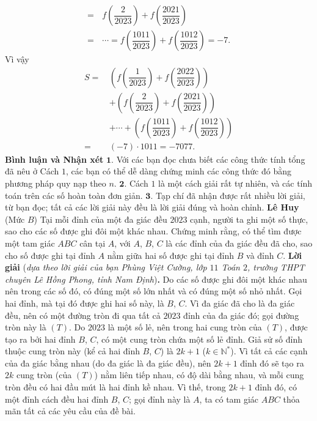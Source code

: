 \begin{multicols}{2}
\begin{align*}
		= \,&f\left( {\dfrac{2}{{2023}}} \right) + f\left( {\dfrac{{2021}}{{2023}}} \right) \\[-0.3ex]
		= \,& \cdots  = f\left( {\dfrac{{1011}}{{2023}}} \right) + f\left( {\dfrac{{1012}}{{2023}}} \right) =  - 7.
	\end{align*}
	Vì vậy
	\begin{align*}
			S =\,& \left( {f\left( {\dfrac{1}{{2023}}} \right) + f\left( {\dfrac{{2022}}{{2023}}} \right)} \right) \\[-0.3ex]
			&+ \left( {f\left( {\dfrac{2}{{2023}}} \right) + f\left( {\dfrac{{2021}}{{2023}}} \right)} \right) \\[-0.3ex]
			&+  \cdots  + \left( {f\left( {\dfrac{{1011}}{{2023}}} \right) + f\left( {\dfrac{{1012}}{{2023}}} \right)} \right)\\[-0.3ex]
			 = \,&\left( { - 7} \right) \cdot 1011 =  - 7077.
	\end{align*}
	\textbf{\color{thachthuctoanhoc}Bình luận và Nhận xét}
	\vskip 0.05cm
	$\pmb{1.}$ Với các bạn đọc chưa biết các công thức tính tổng đã nêu ở Cách $1$, các bạn có thể dễ dàng chứng minh các công thức đó bằng phương pháp quy nạp theo $n$.
	\vskip 0.05cm
	$\pmb{2.}$ Cách $1$ là một cách giải rất tự nhiên, và các tính toán trên các số hoàn toàn đơn giản.
	\vskip 0.05cm
	$\pmb{3.}$ Tạp chí đã nhận được rất nhiều lời giải, từ bạn đọc; tất cả các lời giải này đều là lời giải đúng và hoàn chỉnh.
	\vskip 0.1cm
		\hfill\textbf{\color{thachthuctoanhoc}Lê Huy}
	\vskip 0.1cm
	{}
	(Mức $B$) Tại mỗi đỉnh của một đa giác đều $2023$ cạnh, người ta ghi một số thực, sao cho các số được ghi đôi một khác nhau. Chứng minh rằng, có thể tìm được một tam giác $ABC$ cân tại $A$, với $A$, $B$, $C$ là các đỉnh của đa giác đều đã cho, sao cho số được ghi tại đỉnh $A$ nằm giữa hai số được ghi tại đỉnh $B$ và đỉnh $C$.
	\vskip 0.05cm
	\textbf{\color{thachthuctoanhoc}Lời giải} (\textit{dựa theo lời giải của bạn Phùng Việt Cường, lớp $11$ Toán $2$, trường THPT chuyên Lê Hồng Phong, tỉnh Nam Định})\textbf{\color{thachthuctoanhoc}.}
	\vskip 0.05cm
	Do các số được ghi đôi một khác nhau nên trong các số đó, có đúng một số lớn nhất và có đúng một số nhỏ nhất. Gọi hai đỉnh, mà tại đó được ghi hai số này, là $B$, $C$.
	\vskip 0.05cm
	Vì đa giác đã cho là đa giác đều, nên có một đường tròn đi qua tất cả $2023$ đỉnh của đa giác đó; gọi đường tròn này là $(T)$.
	\vskip 0.05cm
	Do $2023$ là một số lẻ, nên trong hai cung tròn của $(T)$, được tạo ra bởi hai đỉnh $B$, $C$, có một cung tròn chứa một số lẻ đỉnh. Giả sử số đỉnh thuộc cung tròn này (kể cả hai đỉnh $B$, $C$) là $2k + 1$ ($k \in \mathbb{N^*}$). Vì tất cả các cạnh của đa giác bằng nhau (do đa giác là đa giác đều), nên $2k + 1$ đỉnh đó sẽ tạo ra $2k$ cung tròn (của $(T)$) nằm liên tiếp nhau, có độ dài bằng nhau, và mỗi cung tròn đều có hai đầu mút là hai đỉnh kề nhau. Vì thế, trong $2k + 1$ đỉnh đó, có một đỉnh cách đều hai đỉnh $B$, $C$; gọi đỉnh này là $A$, ta có tam giác $ABC$ thỏa mãn tất cả các yêu cầu của đề bài.

\end{multicols}
